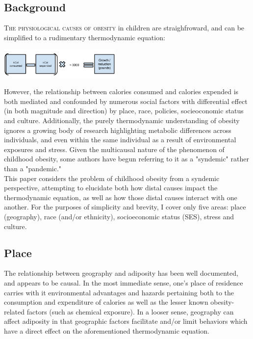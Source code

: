 \documentclass[11pt]{article}
\begin{document}
\begin{multicols}{2} 

\subsection*{Background}

\lettrine[nindent=0em,lines=3]{T}{he physiological causes of obesity}  in children are straighfroward, and can be simplified to a rudimentary thermodynamic equation:
\begin{center}
\includegraphics[width=6cm]{formula}
\end{center}

However, the relationship between calories consumed and calories expended is both mediated and confounded by numerous social factors with differential effect (in both magnitude and direction) by place, race, policies, socieoconomic status and culture.  Additionally, the purely thermodynamic understanding of obesity ignores a growing body of research highlighting metabolic differences across individuals, and even within the same individual as a result of environmental exposures and stress.\cite{Lee2014} Given the multicausal nature of the phenomenon of childhood obesity, some authors have begun referring to it as a "syndemic" rather than a "pandemic."\cite{Myslobodsky2010}  \\

This paper considers the problem of childhood obesity from a syndemic perspective, attempting to elucidate both how distal causes impact the thermodynamic equation, as well as how those distal causes interact with one another.  For the purposes of simplicity and brevity, I cover only five areas: place (geography), race (and/or ethnicity), socioeconomic status (SES), stress and culture.  
 

\subsection*{Place}
The relationship between geography and adiposity has been well documented, and appears to be causal.\cite{vonHippel2014}  In the most immediate sense, one's place of residence carries with it environmental advantages and hazards pertaining both to the consumption and expenditure of calories as well as the lesser known obesity-related factors (such as chemical exposure).  In a looser sense, geography can affect adiposity in that geographic factors facilitate and/or limit behaviors which have a direct effect on the aforementioned thermodynamic equation.  \\


\end{multicols}
\end{document}
